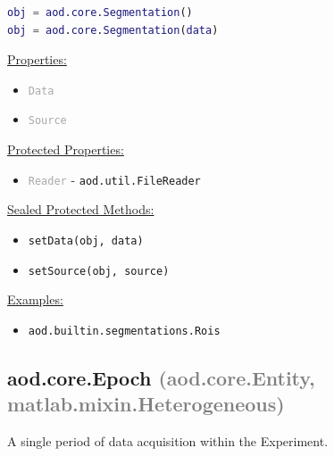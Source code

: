 \documentclass[10pt]{exam}
\newcommand\myparent[1]{\textcolor{gray}{(#1)}}
\newcommand\aodclass[1]{\textcolor{codeblue}{\texttt{#1}}}
\newcommand\aodprop[1]{\textcolor{darkgray}{\texttt{#1}}}
\newcommand\aodfcn[1]{\textcolor{darkteal}{\texttt{#1}}}
\newcommand\docheader[1]{\vspace{0.6ex}\noindent\underline{#1}\vspace{0.15ex}}
\begin{document}
		\begin{lstlisting}[language=matlab]
obj = aod.core.Segmentation()		
obj = aod.core.Segmentation(data)
		\end{lstlisting}
		\docheader{Properties:}
		\begin{itemize}
			\item \aodprop{Data}
			\item \aodprop{Source}
		\end{itemize}
		\docheader{Protected Properties:}
		\begin{itemize}
			\item \aodprop{Reader} - \aodclass{aod.util.FileReader}
		\end{itemize}
		\docheader{Sealed Protected Methods:}
		\begin{itemize}
			\item \aodfcn{setData(obj, data)}
			\item \aodfcn{setSource(obj, source)}
		\end{itemize}
		\docheader{Examples:}
		\begin{itemize}
			\item \aodclass{aod.builtin.segmentations.Rois}
		\end{itemize}

	\subsection{aod.core.Epoch \myparent{aod.core.Entity, matlab.mixin.Heterogeneous}}
		\noindent A single period of data acquisition within the Experiment. 
	
\end{document}
